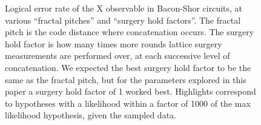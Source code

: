 \documentclass[onecolumn,unpublished,a4paper]{quantumarticle}
\theoremstyle{definition}
\theoremstyle{definition}
\theoremstyle{definition}
\begin{document}
\begin{figure}[H]
    \centering
    \caption{
        Logical error rate of the X observable in Bacon-Shor circuits, at various ``fractal pitches'' and ``surgery hold factors''.
        The fractal pitch is the code distance where concatenation occurs.
        The surgery hold factor is how many times more rounds lattice surgery measurements are performed over, at each successive level of concatenation.
        We expected the best surgery hold factor to be the same as the fractal pitch, but for the parameters explored in this paper a surgery hold factor of 1 worked best.
        Highlights correspond to hypotheses with a likelihood within a factor of 1000 of the max likelihood hypothesis, given the sampled data.
    }
    \label{fig:error_rate_x}
\end{figure}
\end{document}
